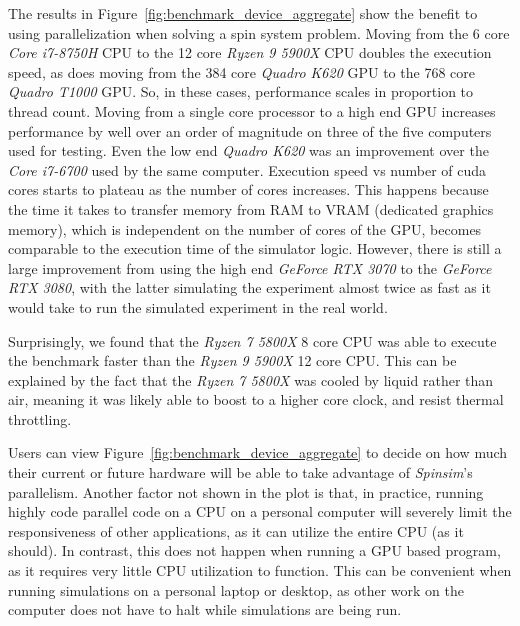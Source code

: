 \documentclass{jors}
\begin{document}
		The results in Figure~\ref{fig:benchmark_device_aggregate} show the benefit to using parallelization when solving a spin system problem.
		Moving from the 6 core \emph{Core i7-8750H} CPU to the 12 core \emph{Ryzen 9 5900X} CPU doubles the execution speed, as does moving from the 384 core \emph{Quadro K620} GPU to the 768 core \emph{Quadro T1000} GPU.
		So, in these cases, performance scales in proportion to thread count.
		Moving from a single core processor to a high end GPU increases performance by well over an order of magnitude on three of the five computers used for testing.
		Even the low end \emph{Quadro K620} was an improvement over the \emph{Core i7-6700} used by the same computer.
		Execution speed vs number of cuda cores starts to plateau as the number of cores increases.
		This happens because the time it takes to transfer memory from RAM to VRAM (dedicated graphics memory), which is independent on the number of cores of the GPU, becomes comparable to the execution time of the simulator logic.
		However, there is still a large improvement from using the high end \emph{GeForce RTX 3070} to the \emph{GeForce RTX 3080}, with the latter simulating the experiment almost twice as fast as it would take to run the simulated experiment in the real world.

		Surprisingly, we found that the \emph{Ryzen 7 5800X} 8 core CPU was able to execute the benchmark faster than the \emph{Ryzen 9 5900X} 12 core CPU.
		This can be explained by the fact that the \emph{Ryzen 7 5800X} was cooled by liquid rather than air, meaning it was likely able to boost to a higher core clock, and resist thermal throttling.

		Users can view Figure~\ref{fig:benchmark_device_aggregate} to decide on how much their current or future hardware will be able to take advantage of \emph{Spinsim}'s parallelism.
		Another factor not shown in the plot is that, in practice, running highly code parallel code on a CPU on a personal computer will severely limit the responsiveness of other applications, as it can utilize the entire CPU (as it should).
		In contrast, this does not happen when running a GPU based program, as it requires very little CPU utilization to function.
		This can be convenient when running simulations on a personal laptop or desktop, as other work on the computer does not have to halt while simulations are being run.
\end{document}
